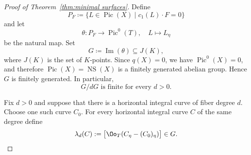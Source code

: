 \documentclass[12pt]{amsart}
\newcommand{\NS}{\operatorname{NS}}
\begin{document}
\begin{proof}[Proof of Theorem~\ref{thm:minimal surfaces}]
Define
\[
    P_F\coloneqq \{L\in\operatorname{Pic}(X)\mid c_1(L)\cdot F=0\}
\]
and let 
\[\theta: P_F\to
       \operatorname{Pic}^0(T), \quad L \mapsto L_\eta
       \] be the natural map. Set
\begin{equation}\label{eq:translation-subgroup-G}
    G\coloneqq\operatorname{Im}(\theta)\subseteq J(K),
\end{equation}
where $J(K)$ is the set of $K$-points.
Since $q(X)=0$, we have $\operatorname{Pic}^0(X)=0$, and therefore
$\operatorname{Pic}(X)=\NS(X)$ is a finitely generated abelian group.  Hence
$G$ is finitely generated. In particular,
\begin{equation}\label{eq:GmoddG-finite}
    G/dG \text{~is finite for every~}d>0.
\end{equation}


Fix $d>0$ and suppose that there is a horizontal integral curve of fiber degree
$d$.  Choose one such curve $C_0$.  For every horizontal integral curve $C$ of
the same degree define
\begin{equation}\label{eq:lambda-d-no-section}
    \lambda_d(C):=
    \bigl[\Oo_T(C_\eta-(C_0)_\eta)\bigr]\in G.
\end{equation}


\end{proof}
\end{document}
